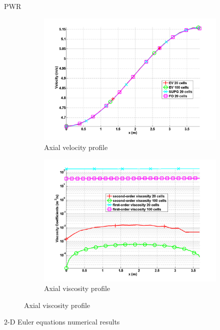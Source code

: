 \documentclass[xcolor=dvipsnames,10pt]{beamer}
\begin{document}
\begin{frame}{PWR}
\begin{figure}[H]
\begin{subfigure}[b]{0.37\textwidth}
\centering
\includegraphics[width=\textwidth]{../figures/PWR_stt_velocity.png}
\caption{Axial velocity profile}
\end{subfigure}
%
\begin{subfigure}[b]{0.37\textwidth}
\centering
\includegraphics[width=\textwidth]{../figures/PWR_stt_viscosity.png}
\caption{Axial viscosity profile}
\end{subfigure}
\end{figure}
\end{frame}
\begin{frame}{}
\begin{center}
$2$-D Euler equations numerical results
\end{center}
\end{frame}
\end{document}
